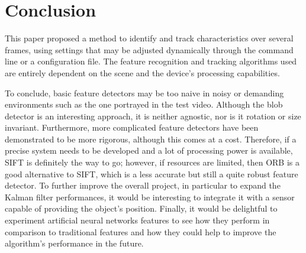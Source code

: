 \documentclass[journal]{IEEEtran}
\begin{document}
\section{Conclusion}
\label{sec:conclusion}
This paper proposed a method to identify and track characteristics over several frames, using settings that may be adjusted dynamically through the command line or a configuration file.
The feature recognition and tracking algorithms used are entirely dependent on the scene and the device's processing capabilities. 

To conclude, basic feature detectors may be too naive in noisy or demanding environments such as the one portrayed in the test video.
Although the blob detector is an interesting approach, it is neither agnostic, nor is it rotation or size invariant.
Furthermore, more complicated feature detectors have been demonstrated to be more rigorous, although this comes at a cost.
Therefore, if a precise system needs to be developed and a lot of processing power is available, SIFT is definitely the way to go; however, if resources are limited, then ORB is a good alternative to SIFT, which is a less accurate but still a quite robust feature detector. 
To further improve the overall project, in particular to expand the Kalman filter performances, it would be interesting to integrate it with a sensor capable of providing the object's position.
Finally, it would be delightful to experiment artificial neural networks features to see how they perform in comparison to traditional features and how they could help to improve the algorithm's performance in the future.





\ifCLASSOPTIONcaptionsoff
  \newpage
\fi
\end{document}

